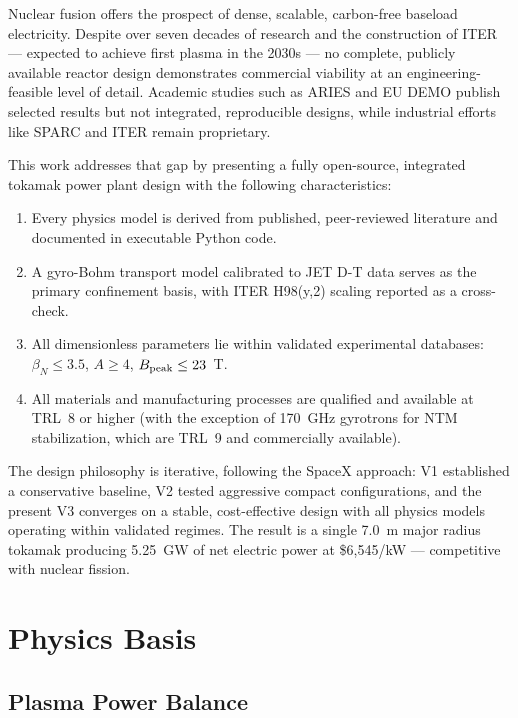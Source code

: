 \documentclass[11pt,a4paper]{article}
\begin{document}
Nuclear fusion offers the prospect of dense, scalable, carbon-free baseload electricity. Despite over seven decades of research and the construction of ITER --- expected to achieve first plasma in the 2030s --- no complete, publicly available reactor design demonstrates commercial viability at an engineering-feasible level of detail. Academic studies such as ARIES and EU DEMO publish selected results but not integrated, reproducible designs, while industrial efforts like SPARC and ITER remain proprietary.

This work addresses that gap by presenting a fully open-source, integrated tokamak power plant design with the following characteristics:

\begin{enumerate}[nosep]
    \item Every physics model is derived from published, peer-reviewed literature and documented in executable Python code.
    \item A gyro-Bohm transport model calibrated to JET D-T data serves as the primary confinement basis, with ITER H98(y,2) scaling reported as a cross-check.
    \item All dimensionless parameters lie within validated experimental databases: $\beta_N \leq 3.5$, $A \geq 4$, $B_{\rm peak} \leq 23$~T.
    \item All materials and manufacturing processes are qualified and available at TRL~8 or higher (with the exception of 170~GHz gyrotrons for NTM stabilization, which are TRL~9 and commercially available).
\end{enumerate}

The design philosophy is iterative, following the SpaceX approach: V1 established a conservative baseline, V2 tested aggressive compact configurations, and the present V3 converges on a stable, cost-effective design with all physics models operating within validated regimes. The result is a single 7.0~m major radius tokamak producing 5.25~GW of net electric power at \$6,545/kW --- competitive with nuclear fission.

\section{Physics Basis}

\subsection{Plasma Power Balance}
\end{document}
